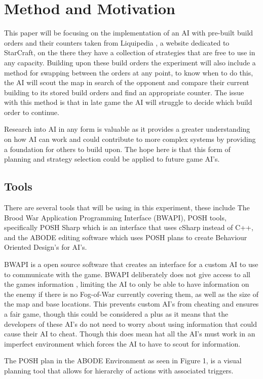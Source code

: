 \documentclass[journal]{IEEEtran}
\begin{document}
\section{Method and Motivation}
This paper will be focusing on the implementation of an AI with pre-built build orders and their counters taken from Liquipedia \cite{Liquid}, a website dedicated to StarCraft, on the there they have a collection of strategies that are free to use in any capacity. Building upon these build orders the experiment will also include a method for swapping between the orders at any point, to know when to do this, the AI will scout the map in search of the opponent and compare their current building to its stored build orders and find an appropriate counter. The issue with this method is that in late game the AI will struggle to decide which build order to continue. 

Research into AI in any form is valuable as it provides a greater understanding on how AI can work and could contribute to more complex systems by providing a foundation for others to build upon. The hope here is that this form of planning and strategy selection could be applied to future game AI's.

\subsection{Tools}
There are several tools that will be using in this experiment, these include The Brood War Application Programming Interface (BWAPI), POSH tools, specifically POSH Sharp which is an interface that uses cSharp instead of C++, and the ABODE editing software which uses POSH plans to create Behaviour Oriented Design's for AI's. 

BWAPI \cite{BWAPI} is a open source software that creates an interface for a custom AI to use to communicate with the game. BWAPI deliberately does not give access to all the games information \cite{POSH}, limiting the AI to only be able to have information on the enemy if there is no Fog-of-War currently covering them, as well as the size of the map and base locations. This prevents custom AI's from cheating and ensures a fair game, though this could be considered a plus as it means that the developers of these AI's do not need to worry about using information that could cause their AI to cheat. Though this does mean hat all the AI's must work in an imperfect environment which forces the AI to have to scout for information.

The POSH plan in the ABODE Environment as seen in Figure 1, is a visual planning tool that allows for hierarchy of actions with associated triggers.
\end{document}
